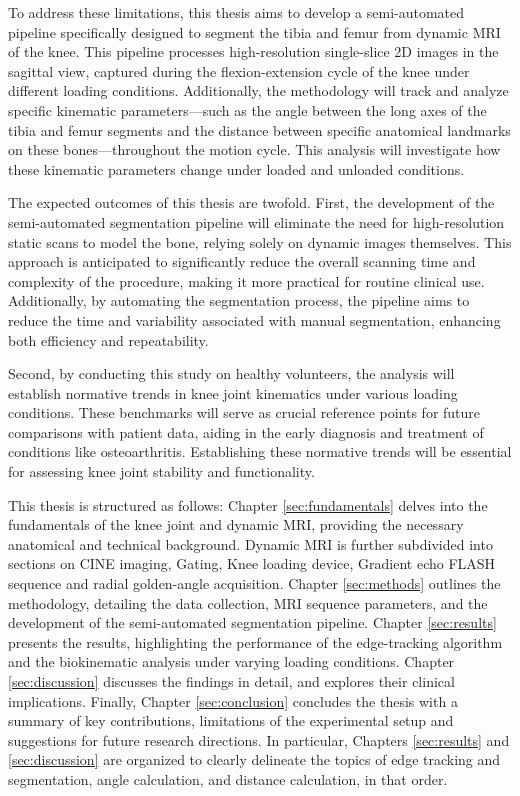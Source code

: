 \documentclass{micro-econ-thesis}
\begin{document}
To address these limitations, this thesis aims to develop a semi-automated pipeline specifically designed to segment the tibia and femur from dynamic MRI of the knee. This pipeline processes high-resolution single-slice 2D images in the sagittal view, captured during the flexion-extension cycle of the knee under different loading conditions. Additionally, the methodology will track and analyze specific kinematic parameters—such as the angle between the long axes of the tibia and femur segments and the distance between specific anatomical landmarks on these bones—throughout the motion cycle. This analysis will investigate how these kinematic parameters change under loaded and unloaded conditions.

The expected outcomes of this thesis are twofold. First, the development of the semi-automated segmentation pipeline will eliminate the need for high-resolution static scans to model the bone, relying solely on dynamic images themselves. This approach is anticipated to significantly reduce the overall scanning time and complexity of the procedure, making it more practical for routine clinical use. Additionally, by automating the segmentation process, the pipeline aims to reduce the time and variability associated with manual segmentation, enhancing both efficiency and repeatability.

Second, by conducting this study on healthy volunteers, the analysis will establish normative trends in knee joint kinematics under various loading conditions. These benchmarks will serve as crucial reference points for future comparisons with patient data, aiding in the early diagnosis and treatment of conditions like osteoarthritis. Establishing these normative trends will be essential for assessing knee joint stability and functionality. 

This thesis is structured as follows: Chapter \ref{sec:fundamentals} delves into the fundamentals of the knee joint and dynamic MRI, providing the necessary anatomical and technical background. Dynamic MRI is further subdivided into sections on CINE imaging, Gating, Knee loading device, Gradient echo FLASH sequence and radial golden-angle acquisition. Chapter \ref{sec:methods} outlines the methodology, detailing the data collection, MRI sequence parameters, and the development of the semi-automated segmentation pipeline.  Chapter \ref{sec:results} presents the results, highlighting the performance of the edge-tracking algorithm and the biokinematic analysis under varying loading conditions. Chapter \ref{sec:discussion} discusses the findings in detail, and explores their clinical implications.
Finally, Chapter \ref{sec:conclusion} concludes the thesis with a summary of key contributions, limitations of the experimental setup and suggestions for future research directions. In particular, Chapters \ref{sec:results} and \ref{sec:discussion} are organized to clearly delineate the topics of edge tracking and segmentation, angle calculation, and distance calculation, in that order. 
\end{document}

